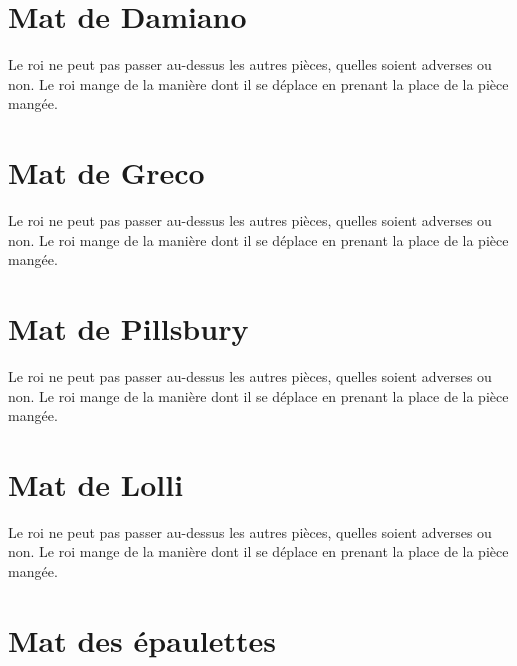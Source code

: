 \documentclass[a5paper,openany,twocolumn]{book}
\begin{document}
{%

\chapter{Mat de Damiano}
 
Le roi ne peut pas passer au-dessus les autres pièces, quelles soient adverses ou non. Le roi mange de la manière dont il se déplace en prenant la place de la pièce mangée. 


\chapter{Mat de Greco}
 
Le roi ne peut pas passer au-dessus les autres pièces, quelles soient adverses ou non. Le roi mange de la manière dont il se déplace en prenant la place de la pièce mangée. 


\chapter{Mat de Pillsbury}

Le roi ne peut pas passer au-dessus les autres pièces, quelles soient adverses ou non. Le roi mange de la manière dont il se déplace en prenant la place de la pièce mangée. 


\chapter{Mat de Lolli}

Le roi ne peut pas passer au-dessus les autres pièces, quelles soient adverses ou non. Le roi mange de la manière dont il se déplace en prenant la place de la pièce mangée. 


\chapter{Mat des épaulettes}
 
}
\end{document}
